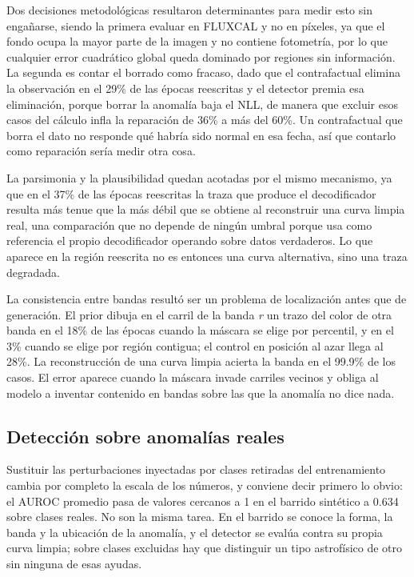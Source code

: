 Dos decisiones metodológicas resultaron determinantes para medir esto sin engañarse, siendo la primera evaluar en FLUXCAL y no en píxeles, ya que el fondo ocupa la mayor parte de la imagen y no contiene fotometría, por lo que cualquier error cuadrático global queda dominado por regiones sin información. La segunda es contar el borrado como fracaso, dado que el contrafactual elimina la observación en el 29\% de las épocas reescritas y el detector premia esa eliminación, porque borrar la anomalía baja el NLL, de manera que excluir esos casos del cálculo infla la reparación de 36\% a más del 60\%. Un contrafactual que borra el dato no responde qué habría sido normal en esa fecha, así que contarlo como reparación sería medir otra cosa.

La parsimonia y la plausibilidad quedan acotadas por el mismo mecanismo, ya que en el 37\% de las épocas reescritas la traza que produce el decodificador resulta más tenue que la más débil que se obtiene al reconstruir una curva limpia real, una comparación que no depende de ningún umbral porque usa como referencia el propio decodificador operando sobre datos verdaderos. Lo que aparece en la región reescrita no es entonces una curva alternativa, sino una traza degradada.

La consistencia entre bandas resultó ser un problema de localización antes que de generación. El prior dibuja en el carril de la banda \textit{r} un trazo del color de otra banda en el 18\% de las épocas cuando la máscara se elige por percentil, y en el 3\% cuando se elige por región contigua; el control en posición al azar llega al 28\%. La reconstrucción de una curva limpia acierta la banda en el 99.9\% de los casos. El error aparece cuando la máscara invade carriles vecinos y obliga al modelo a inventar contenido en bandas sobre las que la anomalía no dice nada.

\subsection{Detección sobre anomalías reales}

Sustituir las perturbaciones inyectadas por clases retiradas del entrenamiento cambia por completo la escala de los números, y conviene decir primero lo obvio: el AUROC promedio pasa de valores cercanos a 1 en el barrido sintético a 0.634 sobre clases reales. No son la misma tarea. En el barrido se conoce la forma, la banda y la ubicación de la anomalía, y el detector se evalúa contra su propia curva limpia; sobre clases excluidas hay que distinguir un tipo astrofísico de otro sin ninguna de esas ayudas.


